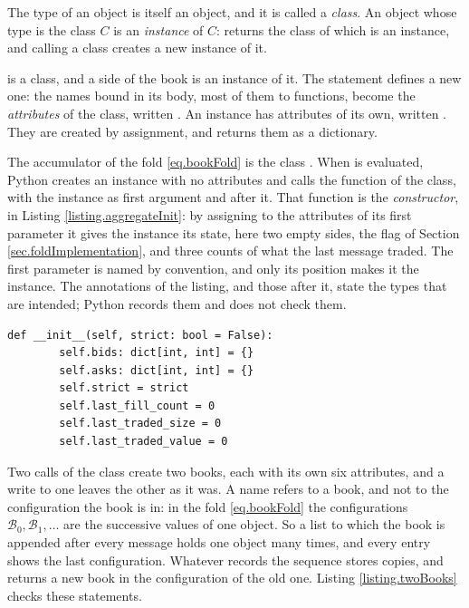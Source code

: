 \begin{defi}\label{def.classAndInstance}
 The type of an object is itself an object, and it is called a \emph{class}.
 An object whose type is the class $C$ is an \emph{instance} of $C$:
  returns the class of which  is an instance,
 and calling a class creates a new instance of it.
\end{defi}

 is a class, and a side of the book is an instance of it.
The statement  defines a new one:
the names bound in its body, most of them to functions,
become the \emph{attributes} of the class, written .
An instance has attributes of its own, written .
They are created by assignment,
and  returns them as a dictionary.

The accumulator of the fold \eqref{eq.bookFold} is the class .
When  is evaluated,
Python creates an instance with no attributes
and calls the function  of the class,
with the instance as first argument and  after it.
That function is the \emph{constructor}, in Listing \ref{listing.aggregateInit}:
by assigning to the attributes of its first parameter it gives the instance its state,
here two empty sides, the flag  of Section \ref{sec.foldImplementation},
and three counts of what the last message traded.
The first parameter is named  by convention,
and only its position makes it the instance.
The annotations of the listing,  and those after it,
state the types that are intended;
Python records them and does not check them.

\begin{lstlisting}[caption={\protect\codehl{unito26.lob.orderbook.AggregateBook.\_\_init\_\_}.}, label=listing.aggregateInit]
    def __init__(self, strict: bool = False):
        self.bids: dict[int, int] = {}
        self.asks: dict[int, int] = {}
        self.strict = strict
        self.last_fill_count = 0
        self.last_traded_size = 0
        self.last_traded_value = 0
\end{lstlisting}

Two calls of the class create two books,
each with its own six attributes,
and a write to one leaves the other as it was.
A name refers to a book, and not to the configuration the book is in:
in the fold \eqref{eq.bookFold} the configurations $\mathcal{B}_0, \mathcal{B}_1, \dots$
are the successive values of one object.
So a list to which the book is appended after every message holds one object many times,
and every entry shows the last configuration.
Whatever records the sequence stores copies,
and  returns a new book in the configuration of the old one.
Listing \ref{listing.twoBooks} checks these statements.

